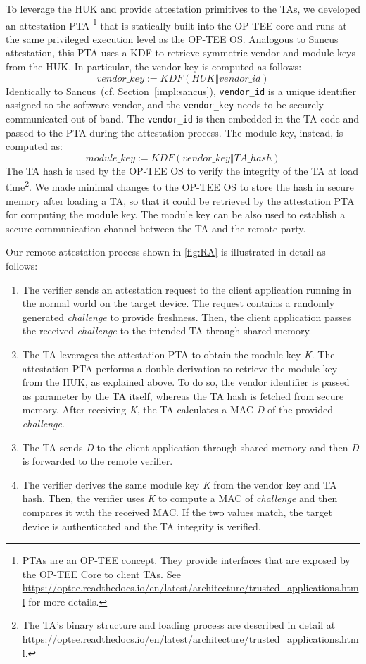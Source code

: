 To leverage the \ac{HUK} and provide attestation primitives to the TAs, we
developed an attestation \ac{PTA}%
%
\footnote{\label{note:trustzone-ta}PTAs are an OP-TEE concept. They
	provide interfaces that are exposed by the OP-TEE Core to client TAs. See
	\url{https://optee.readthedocs.io/en/latest/architecture/trusted_applications.html}
	for more details.}
%
that is statically built into the OP-TEE core and runs at the same privileged
execution level as the OP-TEE OS. Analogous to Sancus attestation, this \ac{PTA}
uses a \ac{KDF} to retrieve symmetric vendor and module keys from the \ac{HUK}.
In particular, the vendor key is computed as follows:%
\[ vendor\_key := KDF(HUK \mathbin\Vert vendor\_id) \]
%
Identically to Sancus~(cf. Section~\ref{impl:sancus}), \texttt{vendor\_id} is a
unique identifier assigned to the software vendor, and the \texttt{vendor\_key}
needs to be securely communicated out-of-band. The \texttt{vendor\_id} is then
embedded in the TA code and passed to the \ac{PTA} during the attestation
process. The module key, instead, is computed as:%
\[ module\_key := KDF(vendor\_key \mathbin\Vert TA\_hash) \]
%
The TA hash is used by the OP-TEE OS to verify the integrity of the TA at load
time\footnote{The TA's binary structure and loading process are described in
detail at
\url{https://optee.readthedocs.io/en/latest/architecture/trusted_applications.html}.}.
We made minimal changes to the OP-TEE OS to store the hash in secure memory
after loading a TA, so that it could be retrieved by the attestation \ac{PTA}
for computing the module key. The module key can be also used to establish a
secure communication channel between the TA and the remote party.

Our remote attestation process shown in \cref{fig:RA} is illustrated in detail
as follows:
%
\begin{enumerate}
	\item The verifier sends an attestation request to the client application
	running in the normal world on the target device. The request contains a
	randomly generated \emph{challenge} to provide freshness. Then, the client
	application passes the received \emph{challenge} to the intended TA through
	shared memory.
	\item The TA leverages the attestation \ac{PTA} to obtain the module key
	\emph{K}. The attestation \ac{PTA} performs a double derivation to retrieve
	the module key from the \ac{HUK}, as explained above. To do so, the vendor
	identifier is passed as parameter by the TA itself, whereas the TA hash is
	fetched from secure memory. After receiving \emph{K}, the TA calculates a
	\ac{MAC} \emph{D} of the provided \emph{challenge}.
	\item The TA sends \emph{D} to the client application through shared memory
	and then \emph{D} is forwarded to the remote verifier. 
	\item The verifier derives the same module key \emph{K} from the vendor key
	and TA hash. Then, the verifier uses \emph{K} to compute a \ac{MAC} of
	\emph{challenge} and then compares it with the received \ac{MAC}. If the two
	values match, the target device is authenticated and the TA integrity is
	verified.
\end{enumerate}

